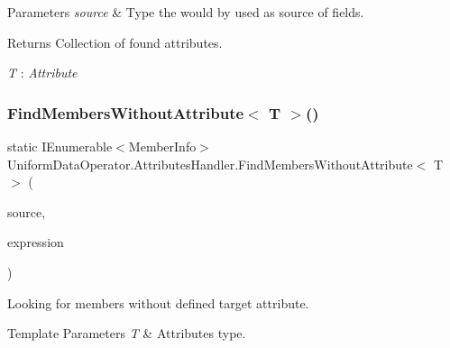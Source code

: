 \begin{DoxyParams}{Parameters}
{\em source} & Type the would by used as source of fields.\\
\hline
\end{DoxyParams}
\begin{DoxyReturn}{Returns}
Collection of found attributes.
\end{DoxyReturn}
\begin{Desc}
\item[Type Constraints]\begin{description}
\item[{\em T} : {\em Attribute}]\end{description}
\end{Desc}
\mbox{\label{class_uniform_data_operator_1_1_attributes_handler_abf0519ca2624a4c03b894e5b5cd2c594}} 
\subsubsection{\texorpdfstring{Find\+Members\+Without\+Attribute$<$ T $>$()}{FindMembersWithoutAttribute< T >()}\hspace{0.1cm}{\footnotesize\ttfamily [1/2]}}
{\footnotesize\ttfamily static I\+Enumerable$<$Member\+Info$>$ Uniform\+Data\+Operator.\+Attributes\+Handler.\+Find\+Members\+Without\+Attribute$<$ T $>$ (\begin{DoxyParamCaption}\item[{I\+Enumerable$<$ Member\+Info $>$}]{source,  }\item[{System.\+Func$<$ Member\+Info, bool $>$}]{expression }\end{DoxyParamCaption})\hspace{0.3cm}{\ttfamily [static]}}



Looking for members without defined target attribute. 


\begin{DoxyTemplParams}{Template Parameters}
{\em T} & Attribute\textquotesingle{}s type.\\
\hline
\end{DoxyTemplParams}

